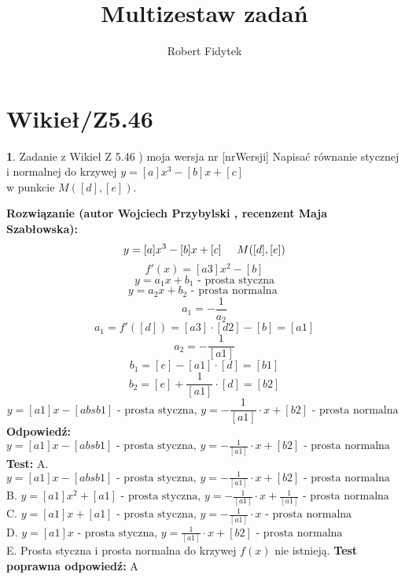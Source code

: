 \documentclass[12pt, a4paper]{article}
\title{Multizestaw zadań}
\author{Robert Fidytek}
\date{}
\theoremstyle{definition} %
\newtheorem{zad}{}
\newcommand{\kategoria}[1]{\section{#1}} %
\newcommand{\zadStart}[1]{\begin{zad}#1\newline} %
\newcommand{\zadStop}{\end{zad}}   %
\newcommand{\rozwStart}[2]{\noindent \textbf{Rozwiązanie (autor #1 , recenzent #2): }\newline} %
\newcommand{\rozwStop}{\newline}                                            %
\newcommand{\odpStart}{\noindent \textbf{Odpowiedź:}\newline}    %
\newcommand{\odpStop}{\newline}                                             %
\newcommand{\testStart}{\noindent \textbf{Test:}\newline} %
\newcommand{\testStop}{\newline} %
\newcommand{\kluczStart}{\noindent \textbf{Test poprawna odpowiedź:}\newline} %
\newcommand{\kluczStop}{\newline} %
\begin{document}
\maketitle


\kategoria{Wikieł/Z5.46}
\zadStart{Zadanie z Wikieł Z 5.46 ) moja wersja nr [nrWersji]}
Napisać równanie stycznej i normalnej do krzywej $y=[a]x^{3}-[b]x+[c]$ \\w punkcie $M([d],[e])$.
\zadStop
\rozwStart{Wojciech Przybylski}{Maja Szabłowska}
$$ y=[a]x^{3}-[b]x+[c] \hspace{5mm} M([d],[e])$$
$$ f'(x)=[a3]x^{2}-[b]$$
$$y=a_{1}x+b_{1} \mbox{ - prosta styczna}$$
$$y=a_{2}x+b_{2} \mbox{ - prosta normalna }$$
$$a_{1}=-\frac{1}{a_{2}}$$
$$a_{1}=f'([d])=[a3]\cdot[d2]-[b]=[a1]$$
$$a_{2}=-\frac{1}{[a1]}$$
$$b_{1}=[e]-[a1]\cdot[d]=[b1]$$
$$b_{2}=[e]+\frac{1}{[a1]}\cdot[d]=[b2]$$
$$y=[a1]x-[absb1] \mbox{ - prosta styczna, }y=-\frac{1}{[a1]}\cdot x+[b2] \mbox{ - prosta normalna }$$
\rozwStop
\odpStart
$y=[a1]x-[absb1] \mbox{ - prosta styczna, }y=-\frac{1}{[a1]}\cdot x+[b2] \mbox{ - prosta normalna }$
\odpStop
\testStart
A. $y=[a1]x-[absb1] \mbox{ - prosta styczna, }y=-\frac{1}{[a1]}\cdot x+[b2] \mbox{ - prosta normalna }$\\
B. $y=[a1]x^{2}+[a1] \mbox{ - prosta styczna, }y=-\frac{1}{[a1]}\cdot x+\frac{1}{[a1]} \mbox{ - prosta normalna }$\\
C. $y=[a1]x+[a1] \mbox{ - prosta styczna, }y=-\frac{1}{[a1]}\cdot x \mbox{ - prosta normalna }$\\
D. $y=[a1]x \mbox{ - prosta styczna, }y=\frac{1}{[a1]}\cdot x+[b2] \mbox{ - prosta normalna }$\\
E. Prosta styczna i prosta normalna do krzywej $f(x)$ nie istnieją.
\testStop
\kluczStart
A
\kluczStop
\end{document}
